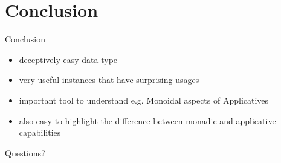 \documentclass[aspectratio=169]{beamer}
\begin{document}
\section{Conclusion}
\begin{frame}
  \begin{center}
    \Huge Conclusion
  \end{center}
\end{frame}

\begin{frame}
  \begin{itemize}
  \item deceptively easy data type
  \item very useful instances that have surprising usages
  \item important tool to understand e.g. Monoidal aspects of
    Applicatives
  \item also easy to highlight the difference between monadic and
    applicative capabilities
  \end{itemize}
\end{frame}

\begin{frame}
  \Huge{}
  Questions?
\end{frame}

\appendix{}
\end{document}

